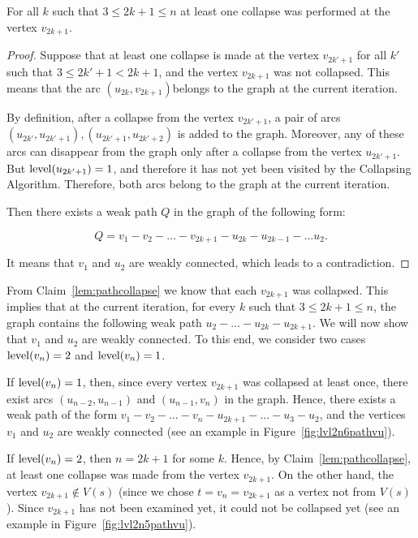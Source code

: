 \begin{claim}
\label{lem:pathcollapse}
For all $ k $ such that $ 3 \le 2k + 1 \le n $ at least one collapse was performed at the vertex $ v_{2k + 1} $.
\end{claim}
\begin{proof}
Suppose that at least one collapse is made at the vertex $ v_{2k '+ 1} $ for all $ k' $ such that $ 3 \le 2k '+ 1 <2k + 1 $, and the vertex $ v_{2k + 1} $ was not collapsed. This means that the arc $ (u_{2k}, v_{2k + 1}) $belongs to the graph at the current iteration.

By definition, after a collapse from the vertex $ v_{2k '+ 1} $, a pair of arcs $ (u_{2k'}, u_{2k '+ 1}), (u_{2k' + 1}, u_{2k '+ 2}) $ is added to the graph. Moreover, any of these arcs can disappear from the graph only after a collapse from the vertex $ u_ {2k '+ 1} $. But $\operatorname{level}(u_ {2k '+ 1})= 1 $, and therefore it has not yet been visited by the Collapsing Algorithm. Therefore, both arcs belong to the graph at the current iteration.

Then there exists a weak path $ Q $ in the graph of the following form:

$$
Q = v_1 - v_2 - \ldots - v_{2k+1} - u_{2k} - u_{2k-1} - \ldots u_2.
$$

It means that $v_1$ and $u_2$ are weakly connected, which leads to a contradiction.
\end{proof}

From Claim~\ref{lem:pathcollapse} we know that each $v_{2k+1}$ was collapsed. This implies that at the current iteration, for every $k$ such that $3\le 2k+1\le n$, the graph contains the following weak path $ u_2 - \ldots - u_{2k} - u_{2k + 1} $. We will now show that $v_1$ and $u_2$ are weakly connected. To this end, we consider two cases $ \operatorname{level} (v_{n}) = 2 $ and $ \operatorname{level} (v_{n}) = 1 $. 

If $ \operatorname{level} (v_{n}) = 1 $, then, since every vertex $ v_{2k + 1} $ was collapsed at least once, there exist arcs $(u_{n-2},u_{n-1} ) $ and $ (u_{n-1}, v_n) $ in the graph. Hence, there exists a weak path of the form $ v_1 - v_2 - \ldots - v_n - u_{2k + 1} - \ldots - u_3 - u_2 $, and the vertices $ v_1 $ and $ u_2 $ are weakly connected (see an example in Figure~\ref{fig:lvl2n6pathvu}).

If $ \operatorname{level} (v_{n}) = 2 $, then $ n = 2k + 1 $ for some $ k $. Hence, by Claim~\ref{lem:pathcollapse}, at least one collapse was made from the vertex $ v_{2k + 1} $. On the other hand, the vertex $ v_{2k + 1} \notin V (s) $ (since we chose $t=v_n=v_{2k+1}$ as a vertex not from $V(s)$). Since $v_{2k+1}$ has not been examined yet, it could not be collapsed yet (see an example in Figure~\ref{fig:lvl2n5pathvu}).


